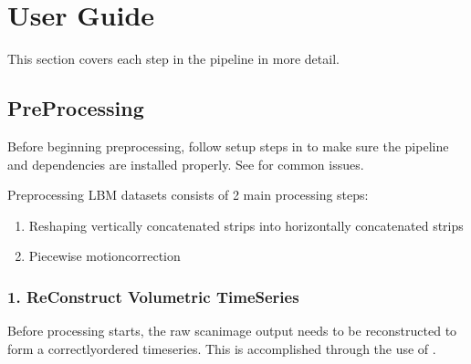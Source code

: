 \documentclass[letterpaper,10pt,english]{sphinxmanual}
\begin{document}

\sphinxstepscope


\section{User Guide}
\label{\detokenize{user_guide/index:user-guide}}\label{\detokenize{user_guide/index::doc}}
\sphinxAtStartPar
This section covers each step in the pipeline in more detail.

\sphinxstepscope


\subsection{Pre\sphinxhyphen{}Processing}
\label{\detokenize{user_guide/pre_processing:pre-processing}}\label{\detokenize{user_guide/pre_processing::doc}}
\sphinxAtStartPar
Before beginning pre\sphinxhyphen{}processing, follow setup steps in {\hyperref[\detokenize{get_started/getting_started:getting-started}]{}} to make sure the pipeline and dependencies are installed properly.
See {\hyperref[\detokenize{user_guide/troubleshooting:troubleshooting}]{}} for common issues.

\sphinxAtStartPar
Pre\sphinxhyphen{}processing LBM datasets consists of 2 main processing steps:
\begin{enumerate}
%
\item {} 
\sphinxAtStartPar
Reshaping vertically concatenated strips into horizontally concatenated strips

\item {} 
\sphinxAtStartPar
Piecewise motion\sphinxhyphen{}correction

\end{enumerate}


\subsubsection{1. Re\sphinxhyphen{}Construct Volumetric Time\sphinxhyphen{}Series}
\label{\detokenize{user_guide/pre_processing:re-construct-volumetric-time-series}}\label{\detokenize{user_guide/pre_processing:pipeline-step-1}}
\sphinxAtStartPar
Before processing starts, the raw scanimage output needs to be reconstructed to form a correctly\sphinxhyphen{}ordered time\sphinxhyphen{}series.
This is accomplished through the use of {\hyperref[\detokenize{api/core:convertScanImageTiffToVolume}]{}}.
\end{document}
